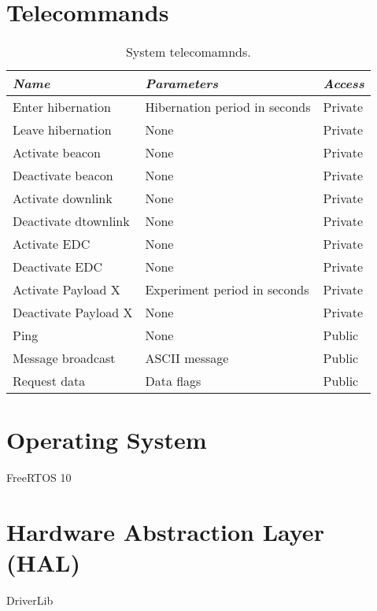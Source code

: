 \section{Telecommands}

\begin{table}[!h]
    \centering
    \begin{tabular}{lll}
        \toprule[1.5pt]
        \textit{Name}          & \textit{Parameters}           & \textit{Access} \\
        \midrule
        Enter hibernation      & Hibernation period in seconds & Private         \\
        Leave hibernation      & None                          & Private         \\
        Activate beacon        & None                          & Private         \\
        Deactivate beacon      & None                          & Private         \\
        Activate downlink      & None                          & Private         \\
        Deactivate dtownlink   & None                          & Private         \\
        Activate EDC           & None                          & Private         \\
        Deactivate EDC         & None                          & Private         \\
        Activate Payload X     & Experiment period in seconds  & Private         \\
        Deactivate Payload X   & None                          & Private         \\
        Ping                   & None                          & Public          \\
        Message broadcast      & ASCII message                 & Public          \\
        Request data           & Data flags                    & Public          \\
        \bottomrule[1.5pt]
    \end{tabular}
    \caption{System telecomamnds.}
    \label{tab:system-telecommands}
\end{table}

\section{Operating System}

FreeRTOS 10

\section{Hardware Abstraction Layer (HAL)}

DriverLib

